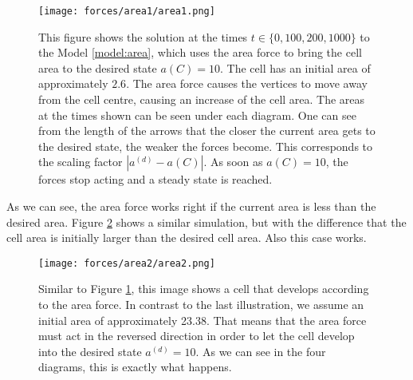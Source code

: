 \documentclass[a4paper,12pt,leqno]{article}
\theoremstyle{plain}
\theoremstyle{remark}
\begin{document}
\begin{figure}[h!]
	\begin{center}
		\texttt{[image: forces/area1/area1.png]}
		\caption{This figure shows the solution at the times $t \in \{0, 100, 200, 1000\}$ to the Model \ref{model:area}, which uses the area force to bring the cell area to the desired state $a(C) = 10$. The cell has an initial  area of approximately $2.6$. The area force causes the vertices to move away from the cell centre, causing an increase of the cell area. The areas at the times shown can be seen under each diagram. One can see from the length of the arrows that the closer the current area gets to the desired state, the weaker the forces become. This corresponds to the scaling factor $|a^{(d)} - a(C)|$.	As soon as $a(C) = 10$, the forces stop acting and a steady state is reached.}
		\label{fig:areaForce}
	\end{center}
\end{figure}
As we can see, the area force works right if the current area is less than the desired area. Figure \ref{fig:areaForce2} shows a similar simulation, but with the difference that the cell area is initially larger than the desired cell area. Also this case works. 
\begin{figure}[h!]
	\begin{center}
		\texttt{[image: forces/area2/area2.png]}
		\caption{Similar to Figure \ref{fig:areaForce}, this image shows a cell that develops according to the area force. In contrast to the last illustration, we assume an initial area of approximately 23.38. That means that the area force must act in the reversed direction in order to let the cell develop into the desired state $a^{(d)}=10$. As we can see in the four diagrams, this is exactly what happens. }
		\label{fig:areaForce2}
	\end{center}
\end{figure}
\end{document}
